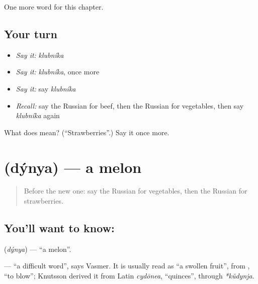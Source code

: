 \begin{grammarlens}[title={What you've built}]
One more word for this chapter.
\end{grammarlens}

\subsection*{Your turn}
\begin{itemize}
\raggedright
  \item \emph{Say it:} \emph{klubníka}
  \item \emph{Say it:} \emph{klubníka}, once more
  \item \emph{Say it:} say \emph{klubníka}
  \item \emph{Recall:} say the Russian for beef, then the Russian for vegetables, then say \emph{klubníka} again
\end{itemize}

\begin{tcolorbox}[breakable,colback=teal!4,colframe=teal!35!black,title={Before you move on}]
What does  mean? (\textquotedblleft{}Strawberries\textquotedblright{}.) Say it once more.
\end{tcolorbox}
\section[\texorpdfstring{\ru{дыня} (dýnya)}{дыня (dýnya)}]{ (dýnya) — a melon}

\label{lesson:RU-C104-melon}



\begin{quote}
Before the new one: say the Russian for vegetables, then the Russian for strawberries.
\end{quote}

\subsection*{You'll want to know: }
\textbf{} (\emph{dýnya}) — \textquotedblleft{}a melon\textquotedblright{}.

\begin{cousinweb}
\textbf{} — \textquotedblleft{}a difficult word\textquotedblright{}, says Vasmer. It is usually read as \textquotedblleft{}a swollen fruit\textquotedblright{}, from \emph{}, \textquotedblleft{}to blow\textquotedblright{}; Knutsson derived it from Latin \emph{cydōnea}, \textquotedblleft{}quinces\textquotedblright{}, through \emph{*kŭdynja}.
\end{cousinweb}

